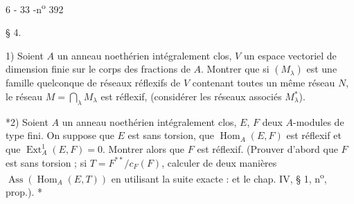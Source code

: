 
\begin{center}6 - 33 -\hfill n\textsuperscript{o} 392\end{center}
\begin{center}§ 4.\end{center}

1) Soient $A$ un anneau noethérien intégralement clos, $V$ un espace vectoriel de dimension finie sur le corps des fractions de $A$. Montrer que si $(M_\lambda)$ est une famille quelconque de réseaux réflexifs de $V$ contenant toutes un même réseau $N$, le réseau $M=\bigcap_\lambda M_\lambda$ est réflexif, (considérer les réseaux associés $M_\lambda^*$).

*2) Soient $A$ un anneau noethérien intégralement clos, $E$, $F$ deux $A$-modules de type fini. On suppose que $E$ est sans torsion, que $\operatorname{Hom}_A(E,F)$ est réflexif et que $\operatorname{Ext}_A^1(E,F)=0$. Montrer alors que $F$ est réflexif. (Prouver d'abord que $F$ est sans torsion ; si $T=F^{**}/c_F(F)$, calculer de deux manières $\operatorname{Ass}(\operatorname{Hom}_A(E,T))$ en utilisant la suite exacte :
et le chap. IV, § 1, n\textsuperscript{o}\quad, prop.\quad). *


